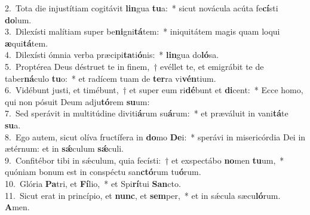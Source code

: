 {2.~}Tota die injustítiam cogitávit \textbf{lin}gua \textbf{tu}a:~* sicut novácula acúta fe\textbf{cí}sti \textbf{do}lum.\\
{3.~}Dilexísti malítiam super be\textbf{ni}gni\textbf{tá}tem:~* iniquitátem magis quam loqui \textbf{æ}qui\textbf{tá}tem.\\
{4.~}Dilexísti ómnia verba præcipi\textbf{ta}ti\textbf{ó}nis:~* \textbf{lin}gua do\textbf{ló}sa.\\
{5.~}Proptérea Deus déstruet te in finem,~† evéllet te, et emigrábit te de taber\textbf{ná}culo \textbf{tu}o:~* et radícem tuam de \textbf{ter}ra vi\textbf{vén}tium.\\
{6.~}Vidébunt justi, et timébunt,~† et super eum ri\textbf{dé}bunt et \textbf{di}cent:~* Ecce homo, qui non pósuit Deum adju\textbf{tó}rem \textbf{su}um:\\
{7.~}Sed sperávit in multitúdine diviti\textbf{á}rum su\textbf{á}rum:~* et præváluit in vani\textbf{tá}te \textbf{su}a.\\
{8.~}Ego autem, sicut olíva fructífera in \textbf{do}mo \textbf{De}i:~* sperávi in misericórdia Dei in ætérnum: et in \textbf{sǽ}culum \textbf{sǽ}culi.\\
{9.~}Confitébor tibi in sǽculum, quia fecísti:~† et exspectábo \textbf{no}men \textbf{tu}um,~* quóniam bonum est in conspéctu san\textbf{ctó}rum tu\textbf{ó}rum.\\
{10.~}Glória \textbf{Pa}tri, et \textbf{Fí}lio,~* et Spi\textbf{rí}tui \textbf{San}cto.\\
{11.~}Sicut erat in princípio, et \textbf{nunc}, et \textbf{sem}per,~* et in sǽcula sæcu\textbf{ló}rum. \textbf{A}men.\\
